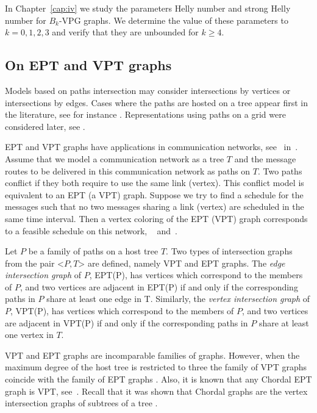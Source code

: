 In Chapter~\ref{cap:iv} we study the parameters Helly number  and strong Helly number for $B_k$-VPG graphs. We determine the value of these parameters to $ k = 0,1,2,3 $ and verify that they are unbounded for $ k\geq 4 $.



\subsection{On EPT and VPT graphs}

Models based on paths intersection  may consider  intersections by vertices or   intersections by edges.  Cases where the paths are hosted on a tree  appear first in the literature, see for instance \cite{gavril1978recognition, golumbic1985edge, golumbic1985}.  Representations using paths on a grid were considered later, see  \cite{golumbic2009,golumbic2013, golumbic2013intersection}.

EPT and VPT graphs have applications in communication networks, see~\cite{boyaci2013graphs} in~\cite{brandstadt2013graph}. Assume
that we model a communication network as a tree $T$ and the message routes to be delivered in this communication network as paths on $T$. Two paths conflict if they both require to use the same link (vertex). This conflict model is equivalent to an EPT (a VPT) graph. Suppose we try to find a schedule for the messages such that no two messages sharing a link (vertex) are scheduled in the same time interval. Then a vertex coloring of the EPT (VPT) graph corresponds to a feasible schedule on this network, ~\cite{boyaci2013graphs} and~\cite{brandstadt2013graph}.

 Let $P$ be a family of paths on a host tree $T$. Two types of intersection graphs from the pair <$P,T$> are defined, namely VPT and EPT graphs.
The \textit{edge intersection graph} of $P$, EPT(P), has vertices which correspond to the members of $P$, and two vertices are adjacent in EPT(P) if and only if the corresponding paths in $P$ share at least one edge in T. Similarly, the \textit{vertex intersection graph} of $P$, VPT(P), has vertices which correspond to the members of $P$, and two vertices are adjacent in VPT(P) if and only if the corresponding paths in $P$ share at least one vertex in $T$.

VPT and EPT graphs are incomparable families of graphs. However, when the maximum degree of the host tree is restricted to three the family of
VPT graphs coincide with the family of EPT graphs \cite{golumbic1985edge}. Also, it is known that any Chordal EPT graph is VPT, see~\cite{syslo1985triangulated}. Recall that it was shown that Chordal graphs are the vertex intersection graphs of subtrees of a tree \cite{gavril1974intersection}.

